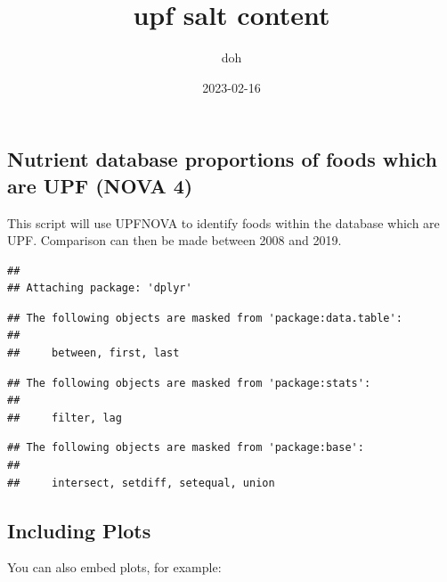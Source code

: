 \documentclass[
]{article}
\title{upf salt content}
\author{doh}
\date{2023-02-16}
\begin{document}
\maketitle

{
\setcounter{tocdepth}{2}
\tableofcontents
}
\hypertarget{nutrient-database-proportions-of-foods-which-are-upf-nova-4}{%
\subsection{Nutrient database proportions of foods which are UPF (NOVA
4)}\label{nutrient-database-proportions-of-foods-which-are-upf-nova-4}}

This script will use UPFNOVA to identify foods within the database which
are UPF. Comparison can then be made between 2008 and 2019.

\begin{verbatim}
## 
## Attaching package: 'dplyr'
\end{verbatim}

\begin{verbatim}
## The following objects are masked from 'package:data.table':
## 
##     between, first, last
\end{verbatim}

\begin{verbatim}
## The following objects are masked from 'package:stats':
## 
##     filter, lag
\end{verbatim}

\begin{verbatim}
## The following objects are masked from 'package:base':
## 
##     intersect, setdiff, setequal, union
\end{verbatim}

\hypertarget{including-plots}{%
\subsection{Including Plots}\label{including-plots}}

You can also embed plots, for example:
\end{document}
